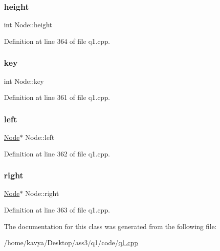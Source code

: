 \subsubsection{\texorpdfstring{height}{height}}
{\footnotesize\ttfamily int Node\+::height}



Definition at line 364 of file q1.\+cpp.

\mbox{\label{class_node_a3020957813f200a9da836428aad2d8d7}} 
\subsubsection{\texorpdfstring{key}{key}}
{\footnotesize\ttfamily int Node\+::key}



Definition at line 361 of file q1.\+cpp.

\mbox{\label{class_node_ab8c667ac8fdb120ed4c031682a9cdaee}} 
\subsubsection{\texorpdfstring{left}{left}}
{\footnotesize\ttfamily \hyperlink{class_node}{Node}$\ast$ Node\+::left}



Definition at line 362 of file q1.\+cpp.

\mbox{\label{class_node_a7328862eaa6dea28018326549b3294d3}} 
\subsubsection{\texorpdfstring{right}{right}}
{\footnotesize\ttfamily \hyperlink{class_node}{Node}$\ast$ Node\+::right}



Definition at line 363 of file q1.\+cpp.



The documentation for this class was generated from the following file\+:\begin{DoxyCompactItemize}
\item 
/home/kavya/\+Desktop/ass3/q1/code/\hyperlink{q1_8cpp}{q1.\+cpp}\end{DoxyCompactItemize}
